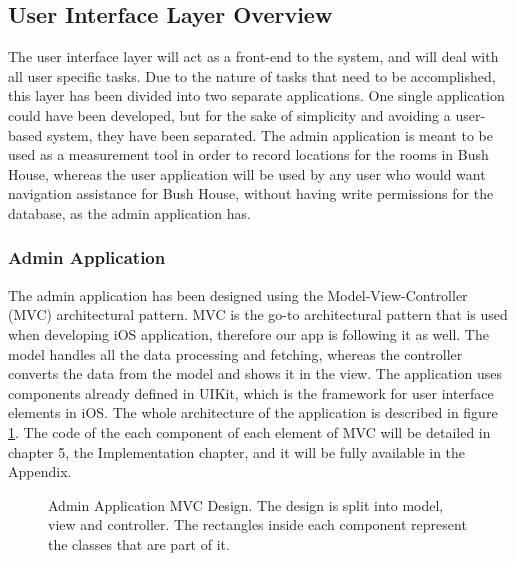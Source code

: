 \subsection{User Interface Layer Overview}
The user interface layer will act as a front-end to the system, and will deal with all user specific tasks. Due to the nature of tasks that need to be accomplished, this layer has been divided into two separate applications. One single application could have been developed, but for the sake of simplicity and avoiding a user-based system, they have been separated. The admin application is meant to be used as a measurement tool in order to record locations for the rooms in Bush House, whereas the user application will be used by any user who would want navigation assistance for Bush House, without having write permissions for the database, as the admin application has.

\subsubsection{Admin Application}
The admin application has been designed using the Model-View-Controller (MVC) architectural pattern. MVC is the go-to architectural pattern that is used when developing iOS application, therefore our app is following it as well. The model handles all the data processing and fetching, whereas the controller converts the data from the model and shows it in the view. The application uses components already defined in UIKit, which is the framework for user interface elements in iOS. The whole architecture of the application is described in figure \ref{fig:admin-mvc}. The code of the each component of each element of MVC will be detailed in chapter 5, the Implementation chapter, and it will be fully available in the Appendix.

\begin{figure}[H]
    \centering
    \centering
    \caption{Admin Application MVC Design. The design is split into model, view and controller. The rectangles inside each component represent the classes that are part of it.}
\label{fig:admin-mvc}
\end{figure}


